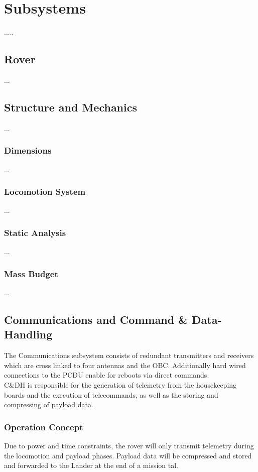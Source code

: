 \chapter{Subsystems}
\label{chap:subsystems}
.....

   

\section{Rover}
\label{sec:rover}
...
\section{Structure and Mechanics}
\label{sec:mechanics}
...
\subsection{Dimensions}
...
\subsection{Locomotion System}
...
\subsection{Static Analysis}
...
\subsection{Mass Budget}
...
\section{Communications and Command \& Data-Handling}
\label{sec:comm}
The Communications subsystem consists of redundant transmitters and receivers which are cross linked to four antennas and the OBC. Additionally hard wired connections to the PCDU enable for reboots via direct commands.\\
C\&DH is responsible for the generation of telemetry from the housekeeping boards and the execution of telecommands, as well as the storing and compressing of payload data. 

\subsection{Operation Concept}

Due to power and time constraints, the rover will only transmit telemetry during the locomotion and payload phases. Payload data will be compressed and stored and forwarded to the Lander at the end of a mission tal. \\ 
 
